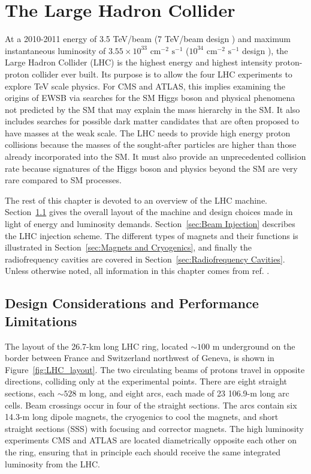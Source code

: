 \documentclass[dissertation.tex]{subfiles}
\begin{document}
\chapter{The Large Hadron Collider}
\label{chap:The Large Hadron Collider}

At a 2010-2011 energy of 3.5 TeV/beam (7 TeV/beam design \cite{LHC_paper}) and maximum instantaneous luminosity of $3.55 \times 10^{33}\mbox{ cm}^{-2}\mbox{ s}^{-1}$ \cite{CMS_2011_summary} ($10^{34}\mbox{ cm}^{-2}\mbox{ s}^{-1}$ design \cite{LHC_paper}), the Large Hadron Collider (LHC) is the highest energy and highest intensity proton-proton collider ever built.  Its purpose is to allow the four LHC experiments to explore TeV scale physics.  For CMS and ATLAS, this implies examining the origins of EWSB via searches for the SM Higgs boson and physical phenomena not predicted by the SM that may explain the mass hierarchy in the SM.  It also includes searches for possible dark matter candidates that are often proposed to have masses at the weak scale.  The LHC needs to provide high energy proton collisions because the masses of the sought-after particles are higher than those already incorporated into the SM.  It must also provide an unprecedented collision rate because signatures of the Higgs boson and physics beyond the SM are very rare compared to SM processes.

The rest of this chapter is devoted to an overview of the LHC machine.  Section~\ref{sec:Design Considerations and Performance Limitations} gives the overall layout of the machine and design choices made in light of energy and luminosity demands.  Section~\ref{sec:Beam Injection} describes the LHC injection scheme.  The different types of magnets and their functions is illustrated in Section~\ref{sec:Magnets and Cryogenics}, and finally the radiofrequency cavities are covered in Section~\ref{sec:Radiofrequency Cavities}.  Unless otherwise noted, all information in this chapter comes from ref. \cite{LHC_paper}.

\section{Design Considerations and Performance Limitations}
\label{sec:Design Considerations and Performance Limitations}

The layout of the 26.7-km long \cite{LHC_public} LHC ring, located $\sim100$ m underground on the border between France and Switzerland northwest of Geneva, is shown in Figure~\ref{fig:LHC_layout}.  The two circulating beams of protons travel in opposite directions, colliding only at the experimental points.  There are eight straight sections, each $\sim528$ m long, and eight arcs, each made of 23 106.9-m long arc cells.  Beam crossings occur in four of the straight sections.  The arcs contain six 14.3-m long dipole magnets, the cryogenics to cool the magnets, and short straight sections (SSS) with focusing and corrector magnets.  The high luminosity experiments CMS and ATLAS are located diametrically opposite each other on the ring, ensuring that in principle each should receive the same integrated luminosity from the LHC.
\end{document}

